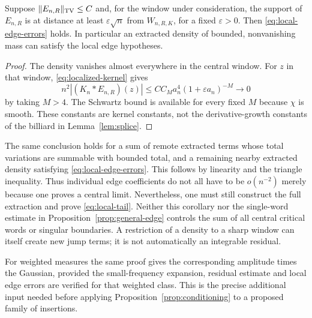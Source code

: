 \begin{corollary}\label{cor:remote-edges}
Suppose $\|E_{n,R}\|_{\operatorname{TV}}\le C$ and, for the window under
consideration, the support of $E_{n,R}$ is at distance at least
$\varepsilon\sqrt n$ from $W_{n,R,K}$, for a fixed
$\varepsilon>0$. Then \eqref{eq:local-edge-errors} holds.
In particular an extracted density of bounded, nonvanishing mass
can satisfy the local edge hypotheses.
\end{corollary}
\begin{proof}
The density vanishes almost everywhere in the central window. For
$z$ in that window, \eqref{eq:localized-kernel} gives
\[
 n^2|(K_n*E_{n,R})(z)|
 \le CC_M a_n^4(1+\varepsilon a_n)^{-M}\longrightarrow0
\]
by taking $M>4$. The Schwartz bound is available for every fixed $M$
because $\chi$ is smooth. These constants are kernel constants, not
the derivative-growth constants of the billiard in Lemma~\ref{lem:splice}.
\end{proof}

The same conclusion holds for a sum of remote extracted terms whose
total variations are summable with bounded total, and a remaining
nearby extracted density satisfying \eqref{eq:local-edge-errors}.
This follows by linearity and the triangle inequality. Thus individual
edge coefficients do not all have to be $o(n^{-2})$ merely because
one proves a central limit. Nevertheless, one must still construct
the full extraction and prove \eqref{eq:local-tail}. Neither this
corollary nor the single-word estimate in Proposition~\ref{prop:general-edge}
controls the sum of all central critical words or singular boundaries.
A restriction of a density to a sharp window can itself create new
jump terms; it is not automatically an integrable residual.

For weighted measures the same proof gives the corresponding amplitude
times the Gaussian, provided the small-frequency expansion, residual
estimate and local edge errors are verified for that weighted class.
This is the precise additional input needed before applying
Proposition~\ref{prop:conditioning} to a proposed family of insertions.
